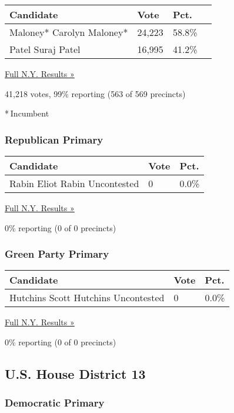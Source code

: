 \begin{longtable}[]{@{}llll@{}}
\toprule
Candidate & Vote & Pct. &\tabularnewline
\midrule
\endhead
 Maloney* Carolyn Maloney* & 24,223 & 58.8\% &\tabularnewline
 Patel Suraj Patel & 16,995 & 41.2\% &\tabularnewline
\bottomrule
\end{longtable}

\href{https://www.nytimes3xbfgragh.onion/elections/results/new-york}{Full
N.Y. Results »}

41,218 votes, 99\% reporting (563 of 569 precincts)

* Incumbent

\hypertarget{republican-primary-8}{%
\subsubsection{Republican Primary}\label{republican-primary-8}}

\begin{longtable}[]{@{}lll@{}}
\toprule
Candidate & Vote & Pct.\tabularnewline
\midrule
\endhead
 Rabin Eliot Rabin Uncontested & 0 & 0.0\%\tabularnewline
\bottomrule
\end{longtable}

\href{https://www.nytimes3xbfgragh.onion/elections/results/new-york}{Full
N.Y. Results »}

0\% reporting (0 of 0 precincts)

\hypertarget{green-party-primary-2}{%
\subsubsection{Green Party Primary}\label{green-party-primary-2}}

\begin{longtable}[]{@{}lll@{}}
\toprule
Candidate & Vote & Pct.\tabularnewline
\midrule
\endhead
 Hutchins Scott Hutchins Uncontested & 0 & 0.0\%\tabularnewline
\bottomrule
\end{longtable}

\href{https://www.nytimes3xbfgragh.onion/elections/results/new-york}{Full
N.Y. Results »}

0\% reporting (0 of 0 precincts)

\hypertarget{us-house-district-13}{%
\subsection{U.S. House District 13}\label{us-house-district-13}}

\hypertarget{democratic-primary-13}{%
\subsubsection{Democratic Primary}\label{democratic-primary-13}}

